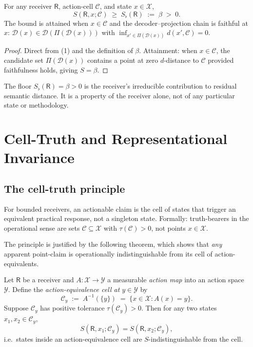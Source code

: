 \documentclass[twocolumn,11pt,a4paper]{article}
\newcommand{\D}{\mathcal{D}}
\newcommand{\X}{\mathcal{X}}
\newcommand{\Y}{\mathcal{Y}}
\newcommand{\Cell}{\mathcal{C}}
\newcommand{\receiver}{\mathsf{R}}
\newcommand{\Sfloor}{S_{\flat}}
\begin{document}
\begin{theorem}\label{thm:floor-receiver}
For any receiver $\receiver$, action-cell $\Cell$, and state $x\in\X$,
\[
S(\receiver,x;\Cell)\;\ge\;\Sfloor(\receiver)\;:=\;\beta\;>\;0.
\]
The bound is attained when $x\in\Cell$ and the decoder--projection chain is
faithful at $x$: $\D(x)\in\D(\Pi(\D(x)))$ with
$\inf_{x'\in\Pi(\D(x))}d(x',\Cell)=0$.
\end{theorem}

\begin{proof}
Direct from (1) and the definition of $\beta$.
Attainment: when $x\in\Cell$, the candidate set $\Pi(\D(x))$ contains a
point at zero $d$-distance to $\Cell$ provided faithfulness holds, giving
$S=\beta$.
\end{proof}

\begin{remark}\label{rem:floor-meaning}
The floor $\Sfloor(\receiver)=\beta>0$ is the receiver's irreducible
contribution to residual semantic distance. It is a property of the
receiver alone, not of any particular state or methodology.
\end{remark}

\section{Cell-Truth and Representational Invariance}
\label{sec:cell-truth}

\subsection{The cell-truth principle}

\begin{principle}\label{prin:cell-truth}
For bounded receivers, an actionable claim is the cell of states that
trigger an equivalent practical response, not a singleton state. Formally:
truth-bearers in the operational sense are sets $\Cell\subseteq\X$ with
$\tau(\Cell)>0$, not points $x\in\X$.
\end{principle}

The principle is justified by the following theorem, which shows that
\emph{any} apparent point-claim is operationally indistinguishable from its
cell of action-equivalents.

\begin{theorem}\label{thm:cell-truth}
Let $\receiver$ be a receiver and $A:\X\to\Y$ a measurable
\emph{action map} into an action space $\Y$. Define the
\emph{action-equivalence cell at $y\in\Y$} by
\[
\Cell_y \;:=\; A^{-1}(\{y\})\;=\;\{x\in\X:A(x)=y\}.
\]
Suppose $\Cell_y$ has positive tolerance $\tau(\Cell_y)>0$. Then for any
two states $x_1,x_2\in\Cell_y$,
\[
S(\receiver,x_1;\Cell_y)=S(\receiver,x_2;\Cell_y),
\]
i.e.\ states inside an action-equivalence cell are
$S$-indistinguishable from the cell.
\end{theorem}
\end{document}

